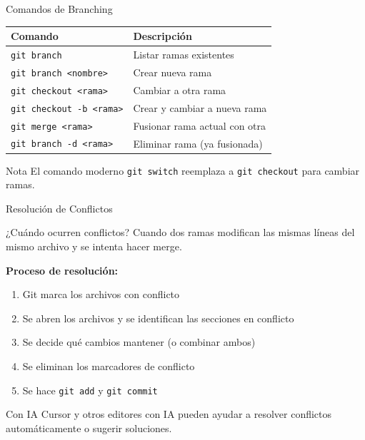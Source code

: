 \documentclass[aspectratio=169]{beamer}
\begin{document}
\begin{frame}{Comandos de Branching}
    \begin{table}[]
        \centering
        \renewcommand{\arraystretch}{1.4}
        \begin{tabular}{p{4.5cm} p{7cm}}
            \toprule
            \textbf{Comando} & \textbf{Descripción} \\
            \midrule
            \texttt{git branch} & Listar ramas existentes \\
            \texttt{git branch <nombre>} & Crear nueva rama \\
            \texttt{git checkout <rama>} & Cambiar a otra rama \\
            \texttt{git checkout -b <rama>} & Crear y cambiar a nueva rama \\
            \texttt{git merge <rama>} & Fusionar rama actual con otra \\
            \texttt{git branch -d <rama>} & Eliminar rama (ya fusionada) \\
            \bottomrule
        \end{tabular}
    \end{table}
    
    \vspace{0.3cm}
    \begin{alertblock}{Nota}
        El comando moderno \texttt{git switch} reemplaza a \texttt{git checkout} para cambiar ramas.
    \end{alertblock}
\end{frame}

\begin{frame}{Resolución de Conflictos}
    \begin{block}{¿Cuándo ocurren conflictos?}
        Cuando dos ramas modifican las mismas líneas del mismo archivo y se intenta hacer merge.
    \end{block}
    
    \vspace{0.3cm}
    \textbf{Proceso de resolución:}
    \begin{enumerate}
        \item Git marca los archivos con conflicto
        \item Se abren los archivos y se identifican las secciones en conflicto
        \item Se decide qué cambios mantener (o combinar ambos)
        \item Se eliminan los marcadores de conflicto
        \item Se hace \texttt{git add} y \texttt{git commit}
    \end{enumerate}
    
    \vspace{0.3cm}
    \begin{exampleblock}{Con IA}
        Cursor y otros editores con IA pueden ayudar a resolver conflictos automáticamente o sugerir soluciones.
    \end{exampleblock}
\end{frame}
\end{document}
